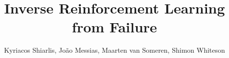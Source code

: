 \documentclass[conference]{IEEEtran}
\begin{document}
\title{Inverse Reinforcement Learning from Failure}

\author{Kyriacos Shiarlis, Jo\~{a}o Messias, Maarten van Someren, Shimon Whiteson}





% 


\maketitle
\end{document}
